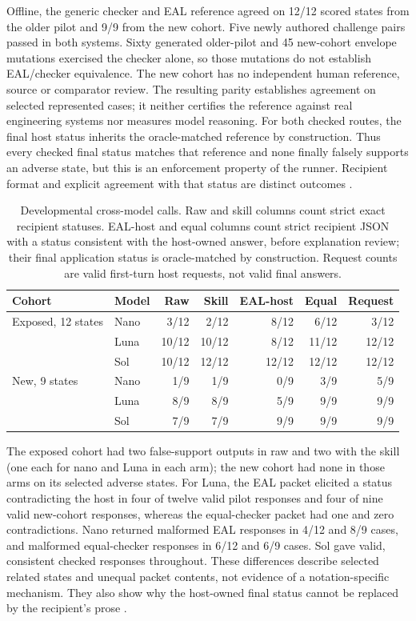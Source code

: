 \documentclass[preprint,12pt]{elsarticle}
\begin{document}
Offline, the generic checker and EAL reference agreed on 12/12 scored states from the older pilot and 9/9 from the new cohort. Five newly authored challenge pairs passed in both systems. Sixty generated older-pilot and 45 new-cohort envelope mutations exercised the checker alone, so those mutations do not establish EAL/checker equivalence. The new cohort has no independent human reference, source or comparator review. The resulting parity establishes agreement on selected represented cases; it neither certifies the reference against real engineering systems nor measures model reasoning. For both checked routes, the final host status inherits the oracle-matched reference by construction. Thus every checked final status matches that reference and none finally falsely supports an adverse state, but this is an enforcement property of the runner. Recipient format and explicit agreement with that status are distinct outcomes \citep{earlCampaignLive}.

\begin{table}[!htbp]
\centering
\small
\setlength{\tabcolsep}{4pt}
\caption{Developmental cross-model calls. Raw and skill columns count strict exact recipient statuses. EAL-host and equal columns count strict recipient JSON with a status consistent with the host-owned answer, before explanation review; their final application status is oracle-matched by construction. Request counts are valid first-turn host requests, not valid final answers.}
\label{tab:cross-model}
\begin{tabular}{@{}llrrrrr@{}}
\toprule
Cohort & Model & Raw & Skill & EAL-host & Equal & Request\\
\midrule
Exposed, 12 states & Nano & 3/12 & 2/12 & 8/12 & 6/12 & 3/12\\
 & Luna & 10/12 & 10/12 & 8/12 & 11/12 & 12/12\\
 & Sol & 10/12 & 12/12 & 12/12 & 12/12 & 12/12\\
\addlinespace
New, 9 states & Nano & 1/9 & 1/9 & 0/9 & 3/9 & 5/9\\
 & Luna & 8/9 & 8/9 & 5/9 & 9/9 & 9/9\\
 & Sol & 7/9 & 7/9 & 9/9 & 9/9 & 9/9\\
\bottomrule
\end{tabular}
\end{table}

The exposed cohort had two false-support outputs in raw and two with the skill (one each for nano and Luna in each arm); the new cohort had none in those arms on its selected adverse states. For Luna, the EAL packet elicited a status contradicting the host in four of twelve valid pilot responses and four of nine valid new-cohort responses, whereas the equal-checker packet had one and zero contradictions. Nano returned malformed EAL responses in 4/12 and 8/9 cases, and malformed equal-checker responses in 6/12 and 6/9 cases. Sol gave valid, consistent checked responses throughout. These differences describe selected related states and unequal packet contents, not evidence of a notation-specific mechanism. They also show why the host-owned final status cannot be replaced by the recipient's prose \citep{earlCampaignLive}.
\end{document}
